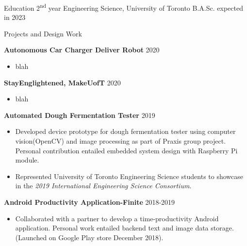 \documentclass{my_resume} %
\begin{document}

    \begin{rSection}{Education}
        2\textsuperscript{nd} year Engineering Science, University of Toronto    \hfill{ B.A.Sc. expected in 2023}
    \end{rSection}





    \begin{rSection}{Projects and Design Work}    
        
        {\bf Autonomous Car Charger Deliver Robot} \hfill{2020}
             \begin{itemize}
                \setlength\itemsep{-0.5em}
                \item blah
            \end{itemize} 

        {\bf StayEnglightened, MakeUofT} \hfill{2020}
            \begin{itemize}
                \setlength\itemsep{-0.5em}
                \item blah
            \end{itemize} 
        
        {\bf Automated Dough Fermentation Tester} \hfill{2019}
        \begin{itemize}
            \setlength\itemsep{-0.5em}
            \item Developed device prototype for dough fermentation tester using computer vision(OpenCV) and image processing as part of Praxis group project. Personal contribution entailed embedded system design with Raspberry Pi module. 
            \item Represented University of Toronto Engineering Science students to showcase in the \emph{2019 International Engineering Science Consortium}. 
        \end{itemize}
            
        {\bf Android Productivity Application-Finite} \hfill{2018-2019} 
        \begin{itemize}
            \setlength\itemsep{-0.5em}
            \item Collaborated with a partner to develop a time-productivity Android application. Personal work entailed backend text and image data storage. (Launched on Google Play store December 2018).
            
        \end{itemize}


    \end{rSection}
\end{document}
